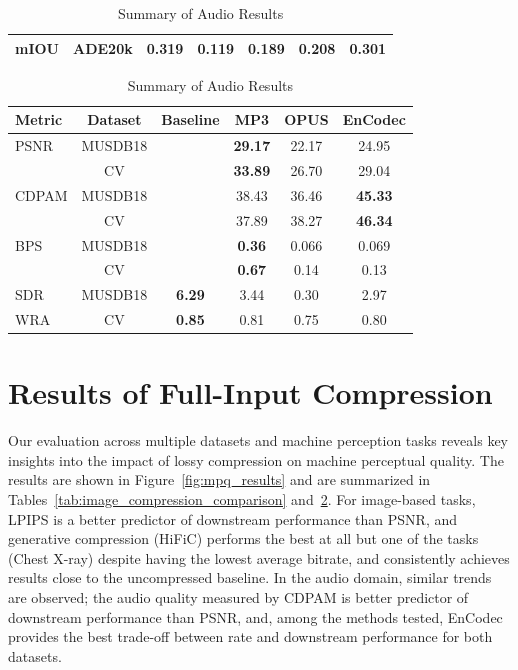\documentclass[10pt,twocolumn,letterpaper]{article}
\begin{document}
\begin{table}[!htb]
\begin{subtable}{.6\linewidth}
{\begin{tabular}{lcccccc}
mIOU & ADE20k & \textbf{0.319} & 0.119 & 0.189 & 0.208 & 0.301 \\
\bottomrule
\end{tabular}}
    \end{subtable} 
    \begin{subtable}{.4\linewidth}
      \centering
        \caption{Summary of Audio Results}
        \label{tab:audio_compression_comparison}
         \setlength{\tabcolsep}{3pt}
        {\small\begin{tabular}{lccccc}
        \toprule
        Metric & Dataset & Baseline & MP3 & OPUS & EnCodec \\
        \midrule
        PSNR & MUSDB18 &  &\textbf{ 29.17} & 22.17 & 24.95 \\
             & CV &  & \textbf{33.89} & 26.70 & 29.04 \\
        \midrule
        CDPAM & MUSDB18 &  & 38.43 & 36.46 & \textbf{45.33} \\
              & CV &  & 37.89 & 38.27 & \textbf{46.34} \\
        \midrule
        BPS & MUSDB18 &  & \textbf{0.36} & 0.066 & 0.069 \\
            & CV &  & \textbf{0.67} & 0.14 & 0.13 \\
        \midrule
        SDR & MUSDB18 & \textbf{6.29} & 3.44 & 0.30 & 2.97 \\
        \midrule
        WRA & CV & \textbf{0.85} & 0.81 & 0.75 & 0.80 \\
        \bottomrule
        \end{tabular}}
    \end{subtable}%
\end{table}

\section{Results of Full-Input Compression}
\label{sec:full-input-results}
Our evaluation across multiple datasets and machine perception tasks reveals key insights into the impact of lossy compression on machine perceptual quality. The results are shown in Figure~\ref{fig:mpq_results} and are summarized in Tables~\ref{tab:image_compression_comparison} and~\ref{tab:audio_compression_comparison}. For image-based tasks, LPIPS is a better predictor of downstream performance than PSNR, and generative compression (HiFiC) performs the best at all but one of the tasks (Chest X-ray) despite having the lowest average bitrate, and consistently achieves results close to the uncompressed baseline. In the audio domain, similar trends are observed; the audio quality measured by CDPAM is better predictor of downstream performance than PSNR, and, among the methods tested, EnCodec provides the best trade-off between rate and downstream performance for both datasets.
\end{document}
